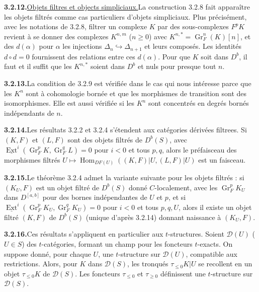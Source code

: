 \documentclass[12pt,a4paper]{article}
\theoremstyle{plain}
\theoremstyle{definition}
\DeclareMathOperator{\Hom}{Hom}
\DeclareMathOperator{\Ext}{Ext}
\DeclareMathOperator{\Gr}{Gr}
\begin{document}
\smallskip
\noindent\textbf{3.2.12.}\quad \underline{Objets filtres et objects simpliciaux.}\quad La construction 3.2.8 fait appara\^itre les objets filtr\'es comme cas particuliers d'objets simpliciaux. Plus pr\'ecis\'ement, avec les notations de 3.2.8, filtrer un complexe $K$ par des sous-complexes $F^p K$ revient \`a se donner des complexes $K^{n,m}$ ($n \geqslant 0$) avec $K^{n,*} = \Gr_F^n(K)[n]$, et des $d(\alpha)$ pour $\alpha$ les injections $\Delta_n \hookrightarrow \Delta_{n+1}$ et leurs compos\'es. Les identit\'es $d \circ d = 0$ fournissent des relations entre ces $d(\alpha)$. Pour que $K$ soit dans $D^b$, il faut et il suffit que les $K^{n,*}$ soient dans $D^b$ et nuls pour presque tout $n$.

\smallskip
\noindent\textbf{3.2.13.}\quad La condition de 3.2.9 est v\'erifi\'ee dans le cas qui nous int\'eresse parce que les $K^n$ sont \`a cohomologie born\'ee et que les morphismes de transition sont des isomorphismes. Elle est aussi v\'erifi\'ee si les $K^n$ sont concentr\'es en degr\'es born\'es ind\'ependants de $n$.

\smallskip
\noindent\textbf{3.2.14.}\quad Les r\'esultats 3.2.2 et 3.2.4 s'\'etendent aux cat\'egories d\'eriv\'ees filtrees. Si $(K, F)$ et $(L, F)$ sont des objets filtr\'es de $D^b(S)$, avec $\underline{\Ext}^i(\Gr_F^p K, \Gr_F^q L) = 0$ pour $i < 0$ et tous $p, q$, alors le pr\'efaisceau des morphismes filtr\'es $U \mapsto \Hom_{DF(U)}((K, F)|U, (L, F)|U)$ est un faisceau.

\smallskip
\noindent\textbf{3.2.15.}\quad Le th\'eor\`eme 3.2.4 admet la variante suivante pour les objets filtr\'es : si $(K_U, F)$ est un objet filtr\'e de $D^b(S)$ donn\'e $C$-localement, avec les $\Gr_F^p K_U$ dans $D^{[a,b]}$ pour des bornes ind\'ependantes de $U$ et $p$, et si $\underline{\Ext}^i(\Gr_F^p K_U, \Gr_F^q K_U) = 0$ pour $i < 0$ et tous $p, q, U$, alors il existe un objet filtr\'e $(K, F)$ de $D^b(S)$ (unique d'apr\`es 3.2.14) donnant naissance \`a $(K_U, F)$.

\smallskip
\noindent\textbf{3.2.16.}\quad Ces r\'esultats s'appliquent en particulier aux $t$-structures. Soient $\mathcal{D}(U)$ ($U \in S$) des $t$-cat\'egories, formant un champ pour les foncteurs $t$-exacts. On suppose donn\'e, pour chaque $U$, une $t$-structure sur $\mathcal{D}(U)$, compatible aux restrictions. Alors, pour $K$ dans $\mathcal{D}(S)$, les tronqu\'es $\tau_{\leqslant 0} K|U$ se recollent en un objet $\tau_{\leqslant 0} K$ de $\mathcal{D}(S)$. Les foncteurs $\tau_{\leqslant 0}$ et $\tau_{\geqslant 0}$ d\'efinissent une $t$-structure sur $\mathcal{D}(S)$.
\end{document}

